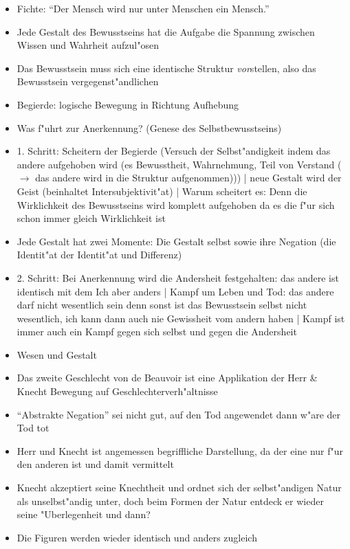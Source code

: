 \documentclass[emulatestandardclasses]{scrartcl}
\begin{document}
\begin{itemize}
  \item Fichte: "`Der Mensch wird nur unter Menschen ein Mensch."'
  \item Jede Gestalt des Bewusstseins hat die Aufgabe die Spannung zwischen Wissen und Wahrheit aufzul"osen
  \item Das Bewusstsein muss sich eine identische Struktur \emph{vor}stellen, also das Bewusstsein vergegenst"andlichen
  \item Begierde: logische Bewegung in Richtung Aufhebung
  \item Was f"uhrt zur Anerkennung? (Genese des Selbstbewusstseins)
  \item 1. Schritt: Scheitern der Begierde (Versuch der Selbst"andigkeit indem das andere aufgehoben wird (es Bewusstheit, Wahrnehmung, Teil von Verstand ($\rightarrow$ das andere wird in die Struktur aufgenommen))) | neue Gestalt wird der Geist (beinhaltet Intersubjektivit"at) | Warum scheitert es: Denn die Wirklichkeit des Bewusstseins wird komplett aufgehoben da es die f"ur sich schon immer gleich Wirklichkeit ist
  \item Jede Gestalt hat zwei Momente: Die Gestalt selbst sowie ihre Negation (die Identit"at der Identit"at und Differenz)
  \item 2. Schritt: Bei Anerkennung wird die Andersheit festgehalten: das andere ist identisch mit dem Ich aber anders | Kampf um Leben und Tod: das andere darf nicht wesentlich sein denn sonst ist das Bewusstsein selbst nicht wesentlich, ich kann dann auch nie Gewissheit vom andern haben | Kampf ist immer auch ein Kampf gegen sich selbst und gegen die Andersheit
  \item Wesen und Gestalt
  \item Das zweite Geschlecht von de Beauvoir ist eine Applikation der Herr \& Knecht Bewegung auf Geschlechterverh"altnisse
  \item "`Abstrakte Negation"' sei nicht gut, auf den Tod angewendet dann w"are der Tod tot
  \item Herr und Knecht ist angemessen begriffliche Darstellung, da der eine nur f"ur den anderen ist und damit vermittelt
  \item Knecht akzeptiert seine Knechtheit und ordnet sich der selbst"andigen Natur als unselbst"andig unter, doch beim Formen der Natur entdeck er wieder seine "Uberlegenheit und dann?
  \item Die Figuren werden wieder identisch und anders zugleich
\end{itemize}
\end{document}
